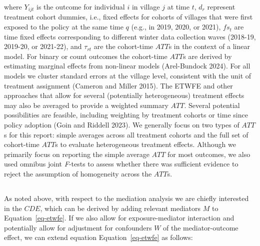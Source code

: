 \documentclass[
  letterpaper,
  DIV=11,
  numbers=noendperiod]{scrartcl}
\providecommand{\DIFaddtex}[1]{{\protect\color{blue}\uwave{#1}}} %
\providecommand{\DIFaddbegin}{} %
\providecommand{\DIFaddend}{} %
\providecommand{\DIFdelbegin}{} %
\providecommand{\DIFdelend}{} %
\providecommand{\DIFadd}[1]{\texorpdfstring{\DIFaddtex{#1}}{#1}} %
\newcommand{\DIFscaledelfig}{0.5}
\newlength{\DIFdelgraphicswidth} %
\newlength{\DIFdelgraphicsheight} %
\newcommand{\DIFaddincludegraphics}[2][]{{\color{blue}\fbox{\DIFOincludegraphics[#1]{#2}}}} %
\newcommand{\DIFdelincludegraphics}[2][]{%
\sbox{\DIFdelgraphicsbox}{\DIFOincludegraphics[#1]{#2}}%
\settoboxwidth{\DIFdelgraphicswidth}{\DIFdelgraphicsbox} %
\settoboxtotalheight{\DIFdelgraphicsheight}{\DIFdelgraphicsbox} %
\scalebox{\DIFscaledelfig}{%
\parbox[b]{\DIFdelgraphicswidth}{\usebox{\DIFdelgraphicsbox}\\[-\baselineskip] \rule{\DIFdelgraphicswidth}{0em}}\llap{\resizebox{\DIFdelgraphicswidth}{\DIFdelgraphicsheight}{%
\setlength{\unitlength}{\DIFdelgraphicswidth}%
\begin{picture}(1,1)%
\thicklines\linethickness{2pt} %
{\color[rgb]{1,0,0}\put(0,0){\framebox(1,1){}}}%
{\color[rgb]{1,0,0}\put(0,0){\line( 1,1){1}}}%
{\color[rgb]{1,0,0}\put(0,1){\line(1,-1){1}}}%
\end{picture}%
}\hspace*{3pt}}} %
} %
\DeclareRobustCommand{\DIFaddbegin}{\DIFOaddbegin \let\includegraphics\DIFaddincludegraphics} %
\DeclareRobustCommand{\DIFaddend}{\DIFOaddend \let\includegraphics\DIFOincludegraphics} %
\DeclareRobustCommand{\DIFdelbegin}{\DIFOdelbegin \let\includegraphics\DIFdelincludegraphics} %
\DeclareRobustCommand{\DIFdelend}{\DIFOaddend \let\includegraphics\DIFOincludegraphics} %
\begin{document}
where \(Y_{ijt}\) is the outcome for individual \(i\) in village \(j\)
at time \(t\), \(d_{r}\) represent treatment cohort dummies, i.e., fixed
effects for cohorts of villages that were first exposed to the policy at
the same time \(q\) (e.g., in 2019, 2020, or 2021), \(fs_{t}\) are time
fixed effects corresponding to different winter data collection waves
(2018-19, 2019-20, or 2021-22), and \(\tau_{rt}\) are the cohort-time
\(ATT\)s in the context of a linear model. For binary or count outcomes
the cohort-time \(ATT\)s are derived by estimating marginal effects from
non-linear models (Arel-Bundock 2024). For all models we cluster
standard errors at the village level, consistent with the unit of
treatment assignment (Cameron and Miller 2015). The ETWFE and other
approaches that allow for several (potentially heterogeneous) treatment
effects may also be averaged to provide a weighted summary \(ATT\).
Several potential possibilities are feasible, including weighting by
treatment cohorts or time since policy adoption (Goin and Riddell 2023).
We generally focus on two types of \(ATT\)s for this report: simple
averages across all treatment cohorts and the full set of cohort-time
\(ATT\)s to evaluate heterogeneous treatment effects. Although we
primarily focus on reporting the simple average \(ATT\) for most
outcomes, we also used omnibus joint \emph{F}-tests to assess whether
there was sufficient evidence to reject the assumption of homogeneity
across the \(ATT\)s.

\DIFdelbegin %
\DIFdelend \DIFaddbegin \subsection{\DIFadd{Mediation Analysis}}\label{mediation-analysis}
\DIFaddend 

As noted above, with respect to the mediation analysis we are chiefly
interested in the \(CDE\), which can be derived by adding relevant
mediators \(M\) to Equation~\ref{eq-etwfe}. If we also allow for
exposure-mediator interaction and potentially allow for adjustment for
confounders \(W\) of the mediator-outcome effect, we can extend equation
Equation~\ref{eq-etwfe} as follows:
\end{document}
